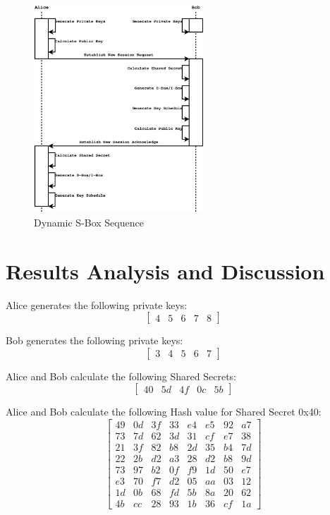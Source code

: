 \documentclass[journal]{IEEEtran}
\begin{document}
\begin{figure}[!t]
	\centering
	\includegraphics[width=2.5in]{Sequence}
	\caption{Dynamic S-Box Sequence}
	\label{Figure:Sequence}
\end{figure}

\section{Results Analysis and Discussion}
Alice generates the following private keys:
$$
\begin{bmatrix} 
4 & 5 & 6 & 7 & 8
\end{bmatrix}
$$

Bob generates the following private keys:
$$
\begin{bmatrix} 
3 & 4 & 5 & 6 & 7
\end{bmatrix}
$$

Alice and Bob calculate the following Shared Secrets:
$$
\begin{bmatrix}
40 & 5d & 4f & 0c & 5b
\end{bmatrix}
$$

Alice and Bob calculate the following Hash value for Shared Secret 0x40:
$$
\begin{bmatrix}
49 & 0d & 3f & 33 & e4 & e5 & 92 & a7 \\
73 & 7d & 62 & 3d & 31 & cf & e7 & 38 \\
21 & 3f & 82 & b8 & 2d & 35 & b4 & 7d \\
22 & 2b & d2 & a3 & 28 & d2 & b8 & 9d \\
73 & 97 & b2 & 0f & f9 & 1d & 50 & e7 \\
e3 & 70 & f7 & d2 & 05 & aa & 03 & 12 \\
1d & 0b & 68 & fd & 5b & 8a & 20 & 62 \\
4b & cc & 28 & 93 & 1b & 36 & cf & 1a 
\end{bmatrix}
$$
\end{document}
